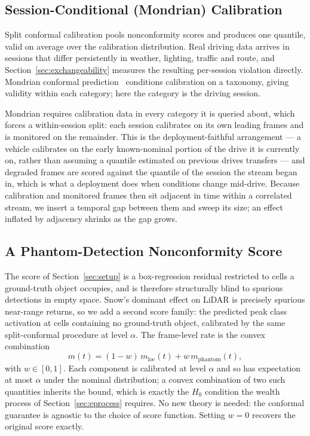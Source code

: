 \subsection{Session-Conditional (Mondrian) Calibration}
\label{sec:method-mondrian}

Split conformal calibration pools nonconformity scores and produces one
quantile, valid on average over the calibration distribution. Real driving
data arrives in sessions that differ persistently in weather, lighting,
traffic and route, and Section~\ref{sec:exchangeability} measures the
resulting per-session violation directly. Mondrian conformal
prediction~\cite{VovkMondrian2003,VovkGammermanShafer2005} conditions
calibration on a taxonomy, giving validity within each category; here the
category is the driving session.

Mondrian requires calibration data in every category it is queried about,
which forces a within-session split: each session calibrates on its own
leading frames and is monitored on the remainder. This is the
deployment-faithful arrangement --- a vehicle calibrates on the early
known-nominal portion of the drive it is currently on, rather than assuming
a quantile estimated on previous drives transfers --- and degraded frames
are scored against the quantile of the session the stream began in, which
is what a deployment does when conditions change mid-drive. Because
calibration and monitored frames then sit adjacent in time within a
correlated stream, we insert a temporal gap between them and sweep its
size; an effect inflated by adjacency shrinks as the gap grows.

\subsection{A Phantom-Detection Nonconformity Score}
\label{sec:method-phantom}

The score of Section~\ref{sec:setup} is a box-regression residual
restricted to cells a ground-truth object occupies, and is therefore
structurally blind to spurious detections in empty space. Snow's dominant
effect on LiDAR is precisely spurious near-range returns, so we add a
second score family: the predicted peak class activation at cells
containing no ground-truth object, calibrated by the same split-conformal
procedure at level $\alpha$. The frame-level rate is the convex combination
\begin{equation}
m(t) = (1 - w)\, m_{\mathrm{loc}}(t) + w\, m_{\mathrm{phantom}}(t),
\label{eq:phantom-mix}
\end{equation}
with $w \in [0,1]$. Each component is calibrated at level $\alpha$ and so
has expectation at most $\alpha$ under the nominal distribution; a convex
combination of two such quantities inherits the bound, which is exactly the
$H_0$ condition the wealth process of Section~\ref{sec:eprocess} requires.
No new theory is needed: the conformal guarantee is agnostic to the choice
of score function. Setting $w = 0$ recovers the original score exactly.


